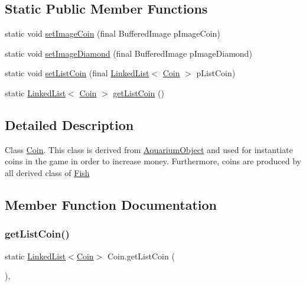 \subsection*{Static Public Member Functions}
\begin{DoxyCompactItemize}
\item 
static void \mbox{\hyperlink{class_coin_a64f7031c90885f5b2968f0ec9416b5a6}{set\+Image\+Coin}} (final Buffered\+Image p\+Image\+Coin)
\item 
static void \mbox{\hyperlink{class_coin_a10e0cd7c1b10e16149d3fb475ce8f1fd}{set\+Image\+Diamond}} (final Buffered\+Image p\+Image\+Diamond)
\item 
static void \mbox{\hyperlink{class_coin_afd75c4b3e2880aaed0bf3ced9ebc2704}{set\+List\+Coin}} (final \mbox{\hyperlink{class_linked_list}{Linked\+List}}$<$ \mbox{\hyperlink{class_coin}{Coin}} $>$ p\+List\+Coin)
\item 
static \mbox{\hyperlink{class_linked_list}{Linked\+List}}$<$ \mbox{\hyperlink{class_coin}{Coin}} $>$ \mbox{\hyperlink{class_coin_a9e49a7cd1e81f67f7664a0619242840f}{get\+List\+Coin}} ()
\end{DoxyCompactItemize}


\subsection{Detailed Description}
Class \mbox{\hyperlink{class_coin}{Coin}}. This class is derived from \mbox{\hyperlink{class_aquarium_object}{Aquarium\+Object}} and used for instantiate coins in the game in order to increase money. Furthermore, coins are produced by all derived class of \mbox{\hyperlink{interface_fish}{Fish}} 

\subsection{Member Function Documentation}
\mbox{\label{class_coin_a9e49a7cd1e81f67f7664a0619242840f}} 
\subsubsection{\texorpdfstring{get\+List\+Coin()}{getListCoin()}}
{\footnotesize\ttfamily static \mbox{\hyperlink{class_linked_list}{Linked\+List}}$<$\mbox{\hyperlink{class_coin}{Coin}}$>$ Coin.\+get\+List\+Coin (\begin{DoxyParamCaption}{ }\end{DoxyParamCaption})\hspace{0.3cm}{\ttfamily [inline]}, {\ttfamily [static]}}

